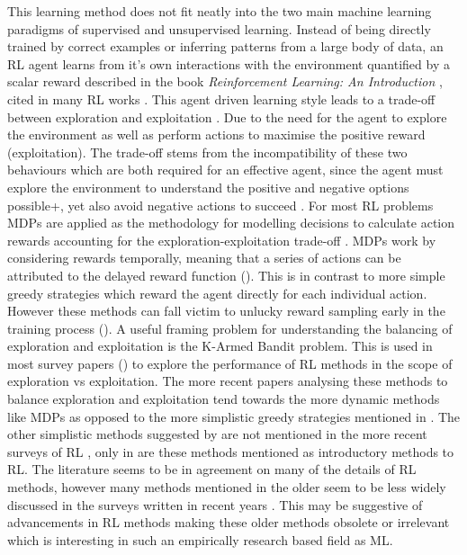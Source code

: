 \documentclass[hidelinks,journal]{IEEEtran}
\begin{document}
This learning method does not fit neatly into the two main machine learning paradigms of supervised and unsupervised learning. Instead of being directly trained by correct examples or inferring patterns from a large body of data, an RL agent learns from it's own interactions with the environment quantified by a scalar reward described in the book \textit{Reinforcement Learning: An Introduction} \textcite{Sutton18}, cited in many RL works \parencite{Amato10, Barto03, Bellemare12, Busoniu08, Gaskett99, Kober13, Smart02}. This agent driven learning style leads to a trade-off between exploration and exploitation \parencite{Sutton18, Kaelbling96, Busoniu08, Kober13}. Due to the need for the agent to explore the environment as well as perform actions to maximise the positive reward (exploitation). The trade-off stems from the incompatibility of these two behaviours which are both required for an effective agent, since the agent must explore the environment to understand the positive and negative options possible+, yet also avoid negative actions to succeed \parencite{Kaelbling96}. For most RL problems MDPs are applied as the methodology for modelling decisions to calculate action rewards accounting for the exploration-exploitation trade-off \parencite{Kober13}. MDPs work by considering rewards temporally, meaning that a series of actions can be attributed to the delayed reward function (\textcite{Kaelbling96, Busoniu08, Kober13}). This is in contrast to more simple greedy strategies which reward the agent directly for each individual action. However these methods can fall victim to unlucky reward sampling early in the training process (\textcite{Kaelbling96}). A useful framing problem for understanding the balancing of exploration and exploitation is the K-Armed Bandit problem. This is used in most survey papers (\textcite{Kaelbling96, Busoniu08, Kober13}) to explore the performance of RL methods in the scope of exploration vs exploitation. The more recent papers \textcite{Busoniu08, Kober13} analysing these methods to balance exploration and exploitation tend towards the more dynamic methods like MDPs as opposed to the more simplistic greedy strategies mentioned in \textcite{Kaelbling96}. The other simplistic methods suggested by \textcite{Kaelbling96} are not mentioned in the more recent surveys of RL \textcite{Busoniu08, Kober13}, only in \textcite{Sutton18} are these methods mentioned as introductory methods to RL. The literature seems to be in agreement on many of the details of RL methods, however many methods mentioned in the older \textcite{Kaelbling96} seem to be less widely discussed in the surveys written in recent years \parencite{Busoniu08, Kober13}. This may be suggestive of advancements in RL methods making these older methods obsolete or irrelevant which is interesting in such an empirically research based field as ML.
\end{document}
